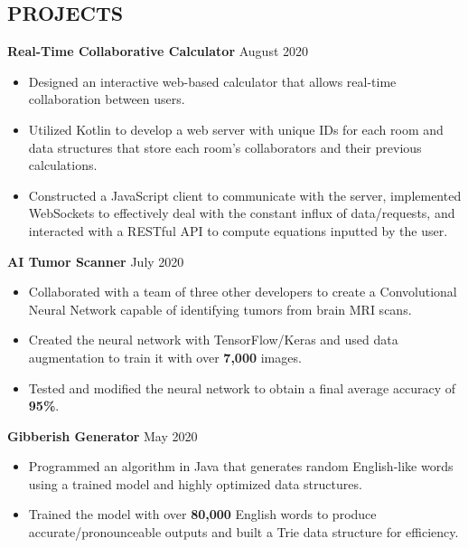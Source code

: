 \documentclass[11pt]{res}
\begin{document}
\begin{footnotesize}
\begin{resume}
\section{PROJECTS} 
\textbf{Real-Time Collaborative Calculator} \hfill August 2020\vspace{-5.25mm}
\begin{itemize} \itemsep -2pt 
\item Designed an interactive web-based calculator that allows real-time collaboration between users. 
\vspace{.75mm}
\item Utilized Kotlin to develop a web server with unique IDs for each room and data structures that store each room's collaborators and their previous calculations.
\vspace{.75mm}
\item Constructed a JavaScript client to communicate with the server, implemented WebSockets to effectively deal with the constant influx of data/requests, and interacted with a RESTful API to compute equations inputted by the user.  
\end{itemize}
\vspace{-2.5mm}
\textbf{AI Tumor Scanner}  \hfill July 2020\vspace{-5.25mm}
\begin{itemize} \itemsep -2pt 
\item Collaborated with a team of three other developers to create a Convolutional Neural Network capable of identifying tumors from brain MRI scans. 
\vspace{.75mm}
\item Created the neural network with TensorFlow/Keras and used data augmentation to train it with over \textbf{7,000} images.
\vspace{.75mm}
\item Tested and modified the neural network to obtain a final average accuracy of \textbf{95\%}.
\end{itemize}
\vspace{-2.5mm}
\textbf{Gibberish Generator} \hfill May 2020\vspace{-5.25mm}
\begin{itemize} \itemsep -2pt 
\item Programmed an algorithm in Java that generates random English-like words using a trained model and highly optimized data structures.  
\vspace{.75mm}
\item Trained the model with over \textbf{80,000} English words to produce accurate/pronounceable outputs and built a Trie data structure for efficiency.

\end{itemize}
\end{resume}
\end{footnotesize}
\end{document}
